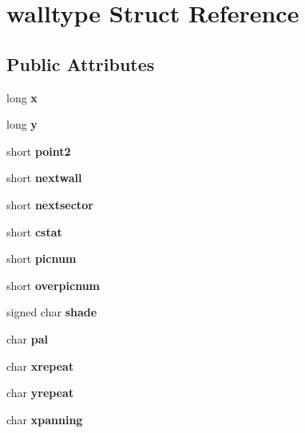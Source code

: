 \section{walltype Struct Reference}
\label{structwalltype}
\subsection*{Public Attributes}
\begin{DoxyCompactItemize}
\item 
long {\bfseries x}\label{structwalltype_a6b7d3cacc27f55ebab2bd0b96b08f872}

\item 
long {\bfseries y}\label{structwalltype_aae128450db5d2b385b0f1ebe7e0641b6}

\item 
short {\bfseries point2}\label{structwalltype_a92cffbaa7d02499f08c872d30524b767}

\item 
short {\bfseries nextwall}\label{structwalltype_a6fabdbc9ded88b6da19b02e882258ed3}

\item 
short {\bfseries nextsector}\label{structwalltype_a72574f0b82a4574d19df6b27f01eea81}

\item 
short {\bfseries cstat}\label{structwalltype_a6867075e071743b80d25a64621333673}

\item 
short {\bfseries picnum}\label{structwalltype_a69d9ab65fb5405912585b6bd12769189}

\item 
short {\bfseries overpicnum}\label{structwalltype_ad9b7e142534657bb5f08d9c4e3585604}

\item 
signed char {\bfseries shade}\label{structwalltype_a1083f1661b63a31ac8802407dc54a69e}

\item 
char {\bfseries pal}\label{structwalltype_ab4442d5ebc73dc00588fb734b40cd2e9}

\item 
char {\bfseries xrepeat}\label{structwalltype_a8111d0442b64872df53575e51ea4f365}

\item 
char {\bfseries yrepeat}\label{structwalltype_a0ed819299e8cbf0cda184c30b93ce102}

\item 
char {\bfseries xpanning}\label{structwalltype_a123f0cb17de2e7f3f0c7f72a10383d22}


\end{DoxyCompactItemize}
